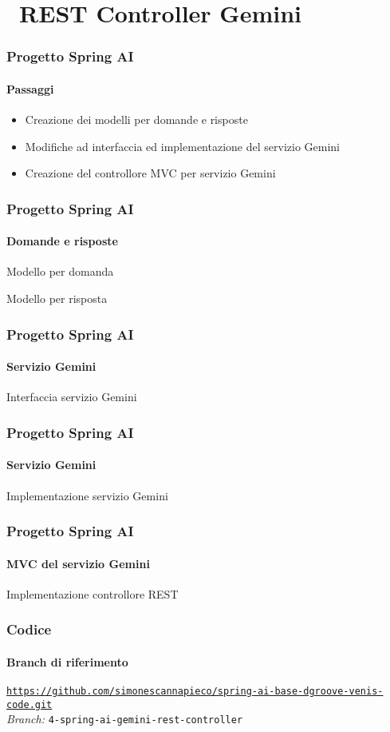 \section{\faWrench\ REST Controller Gemini} %
\label{sec:spring-ai-gemini-rest-controller}
%
\begin{frame}[t,fragile] \frametitle{Progetto Spring AI}
    \framesubtitle{Passaggi}
	\begin{itemize}
		\item[\alertedcircled{1}] Creazione dei modelli per domande e risposte
        \item[\alertedcircled{2}] Modifiche ad interfaccia ed implementazione del servizio Gemini
        \item[\alertedcircled{3}] Creazione del controllore MVC per servizio Gemini
	\end{itemize}        
\end{frame}
%
\begin{frame}[t,fragile] \frametitle{Progetto Spring AI}
    \framesubtitle{Domande e risposte}
        \begin{block}{Modello per domanda}
			{\tiny}
    	\end{block}
        \begin{block}{Modello per risposta}
			{\tiny}
    	\end{block}

\end{frame}
%
\begin{frame}[t,fragile] \frametitle{Progetto Spring AI}
    \framesubtitle{Servizio Gemini}
        \begin{block}{Interfaccia servizio Gemini}
{\tiny}
    \end{block}
\end{frame}
%
\begin{frame}[t,fragile] \frametitle{Progetto Spring AI}
    \framesubtitle{Servizio Gemini}
		\vspace*{-.7cm}
        \begin{block}{Implementazione servizio Gemini}
{\tiny}
    \end{block}
\end{frame}
%
\begin{frame}[t,fragile] \frametitle{Progetto Spring AI}
    \framesubtitle{MVC del servizio Gemini}
        \begin{block}{Implementazione controllore REST}
			{\tiny}
    	\end{block}
\end{frame}
%
\begin{frame}[fragile] \frametitle{Codice}
    \framesubtitle{Branch di riferimento}
	\begin{center}
		{\scriptsize \href{https://github.com/simonescannapieco/spring-ai-base-dgroove-venis-code.git}{\texttt{https://github.com/simonescannapieco/spring-ai-base-dgroove-venis-code.git}}}\\
		\textit{Branch:} \alert{\texttt{4-spring-ai-gemini-rest-controller}}
	\end{center}
\end{frame}